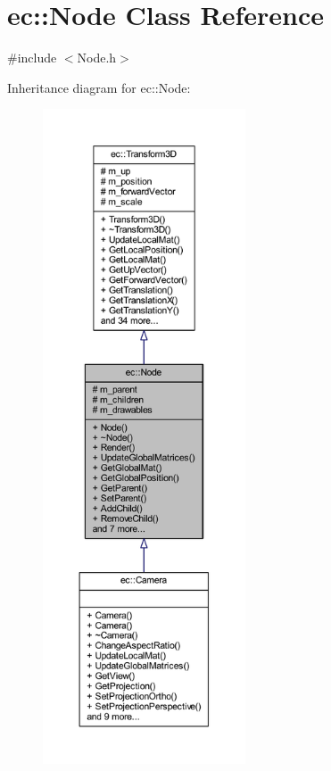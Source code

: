 \hypertarget{classec_1_1_node}{}\section{ec\+:\+:Node Class Reference}
\label{classec_1_1_node}


{\ttfamily \#include $<$Node.\+h$>$}



Inheritance diagram for ec\+:\+:Node\+:
\nopagebreak
\begin{figure}[H]
\begin{center}
\leavevmode
\includegraphics[height=550pt]{classec_1_1_node__inherit__graph}
\end{center}
\end{figure}


